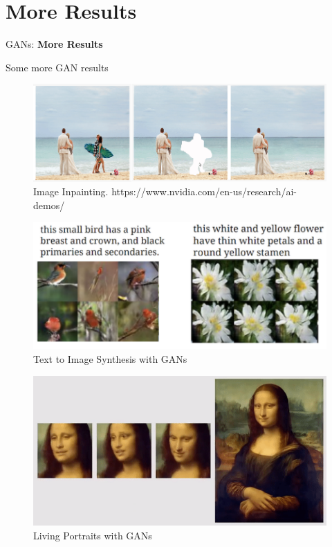 \section{More Results}
\begin{frame}{}
    \LARGE GANs: \textbf{More Results}
\end{frame}

\begin{frame}[allowframebreaks]{Some more GAN results}
\begin{figure}
    \centering
    \includegraphics[height=0.8\textheight, width=\textwidth, keepaspectratio]{images/gan/gan_results_4.png}
    \caption*{Image Inpainting. https://www.nvidia.com/en-us/research/ai-demos/}
\end{figure}

\framebreak

\begin{figure}
    \centering
    \includegraphics[height=0.8\textheight, width=\textwidth, keepaspectratio]{images/gan/gan_results_5.png}
    \caption*{Text to Image Synthesis with GANs}
\end{figure}

\framebreak

\begin{figure}
    \centering
    \includegraphics[height=0.8\textheight, width=\textwidth, keepaspectratio]{images/gan/gan_results_6.png}
    \caption*{Living Portraits with GANs}
\end{figure}


\end{frame}
